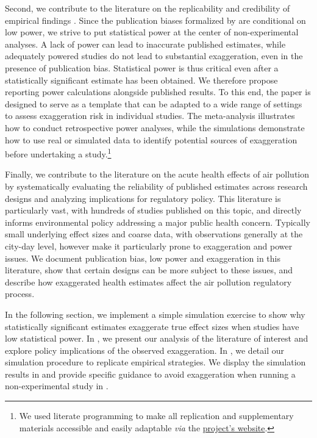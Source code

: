 \documentclass[12pt]{article}
\begin{document}
		 Second, we contribute to the literature on the replicability and credibility of empirical findings \citep{button_power_2013, open_science_collaboration_estimating_2015, christensen_transparency_2018, camerer_evaluating_2016, brodeur_methods_2020, brodeur_mass_2024}. Since the publication biases formalized by \cite{andrews_identification_2019} are conditional on low power, we strive to put statistical power at the center of non-experimental analyses. A lack of power can lead to inaccurate published estimates, while adequately powered studies do not lead to substantial exaggeration, even in the presence of publication bias. Statistical power is thus critical even after a statistically significant estimate has been obtained. We therefore propose reporting power calculations alongside published results. To this end, the paper is designed to serve as a template that can be adapted to a wide range of settings to assess exaggeration risk in individual studies. The meta-analysis illustrates how to conduct retrospective power analyses, while the simulations demonstrate how to use real or simulated data to identify potential sources of exaggeration before undertaking a study.\footnote{We used literate programming to make all replication and supplementary materials accessible and easily adaptable \textit{via} the \href{https://vincentbagilet.github.io/inference_pollution/}{project's website}.}
		 
		 Finally, we contribute to the literature on the acute health effects of air pollution by systematically evaluating the reliability of published estimates across research designs and analyzing implications for regulatory policy. This literature is particularly vast, with hundreds of studies published on this topic, and directly informs environmental policy addressing a major public health concern. Typically small underlying effect sizes and coarse data, with observations generally at the city-day level, however make it particularly prone to exaggeration and power issues. We document publication bias, low power and exaggeration in this literature, show that certain designs can be more subject to these issues, and describe how exaggerated health estimates affect the air pollution regulatory process.
		 
		 In the following section, we implement a simple simulation exercise to show why statistically significant estimates exaggerate true effect sizes when studies have low statistical power. In , we present our analysis of the literature of interest and explore policy implications of the observed exaggeration. In , we detail our simulation procedure to replicate empirical strategies. We display the simulation results in  and provide specific guidance to avoid exaggeration when running a non-experimental study in .
    
\end{document}
